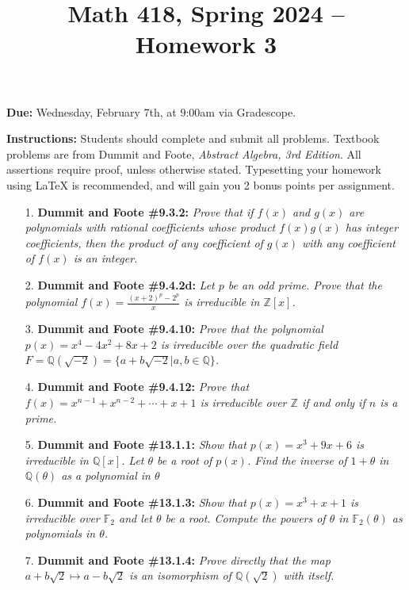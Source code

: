 \documentclass[12pt]{article}
\title{Math 418, Spring 2024 -- Homework 3}
\date{}
\newcommand{\Z}{\mathbb{Z}}
\newcommand{\Q}{\mathbb{Q}}
\newcommand{\F}{\mathbb{F}}
\begin{document}
 \maketitle
\vspace{-80pt}

\textbf{Due:} Wednesday, February 7th, at 9:00am via Gradescope.

\textbf{Instructions:} Students should complete and submit all problems. Textbook problems are from Dummit and Foote, \emph{Abstract Algebra, 3rd Edition}. All assertions require proof, unless otherwise stated. Typesetting your homework using LaTeX is recommended, and will gain you 2 bonus points per assignment.

\begin{enumerate}

\item[1.] \textbf{Dummit and Foote \#9.3.2:} \textit{Prove that if $f(x)$ and $g(x)$ are polynomials with rational coefficients whose product $f(x)g(x)$ has integer coefficients, then the product of any coefficient of $g(x)$ with any coefficient of $f(x)$ is an integer.}

\item[2.] \textbf{Dummit and Foote \#9.4.2d:} \textit{Let $p$ be an odd prime. Prove that the polynomial $f(x) = \frac{(x+2)^p - 2^p}{x}$ is irreducible in $\Z[x]$.}

\item[3.] \textbf{Dummit and Foote \#9.4.10:} \textit{Prove that the polynomial $p(x) = x^4 - 4x^2 + 8x + 2$ is irreducible over the quadratic field $F = \Q(\sqrt{-2}) = \{a + b\sqrt{-2} | a, b \in \Q\}$.}

\item[4.] \textbf{Dummit and Foote \#9.4.12:} \textit{Prove that $f(x) = x^{n-1} + x^{n-2} + \cdots + x + 1$ is irreducible over $\Z$ if and only if $n$ is a prime.}

\item[5.] \textbf{Dummit and Foote \#13.1.1:} \textit{Show that $p(x) = x^3 + 9x +6$ is irreducible in $\Q[x]$. Let $\theta$ be a root of $p(x)$. Find the inverse of $1+\theta$ in $\Q(\theta)$ as a polynomial in $\theta$}

\item[6.] \textbf{Dummit and Foote \#13.1.3:} \textit{Show that $p(x) = x^3+x+1$ is irreducible over $\F_2$ and let $\theta$ be a root. Compute the powers of $\theta$ in $\F_2(\theta)$ as polynomials in $\theta$.}

\item[7.] \textbf{Dummit and Foote \#13.1.4:} \textit{Prove directly that the map $a+b\sqrt{2}\mapsto a-b\sqrt{2}$ is an isomorphism of $\Q(\sqrt{2})$ with itself.}

\end{enumerate}
\end{document}
